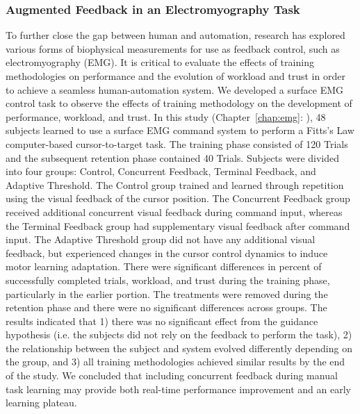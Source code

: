 \subsubsection{Augmented Feedback in an Electromyography Task}
To further close the gap between human and automation, research has explored various forms of biophysical measurements for use as feedback control, such as electromyography (EMG).
It is critical to evaluate the effects of training methodologies on performance and the evolution of workload and trust in order to achieve a seamless human-automation system.
We developed a surface EMG control task to observe the effects of training methodology on the development of performance, workload, and trust.
In this study (Chapter~\ref{chap:emg}: ), 48 subjects learned to use a surface EMG command system to perform a Fitts's Law computer-based cursor-to-target task.
The training phase consisted of 120 Trials and the subsequent retention phase contained 40 Trials.
Subjects were divided into four groups: Control, Concurrent Feedback, Terminal Feedback, and Adaptive Threshold.
The Control group trained and learned through repetition using the visual feedback of the cursor position.
The Concurrent Feedback group received additional concurrent visual feedback during command input, whereas the Terminal Feedback group had supplementary visual feedback after command input.
The Adaptive Threshold group did not have any additional visual feedback, but experienced changes in the cursor control dynamics to induce motor learning adaptation.
There were significant differences in percent of successfully completed trials, workload, and trust during the training phase, particularly in the earlier portion.
The treatments were removed during the retention phase and there were no significant differences across groups.
The results indicated that 1) there was no significant effect from the guidance hypothesis (i.e. the subjects did not rely on the feedback to perform the task), 2) the relationship between the subject and system evolved differently depending on the group, and 3) all training methodologies achieved similar results by the end of the study.
We concluded that including concurrent feedback during manual task learning may provide both real-time performance improvement and an early learning plateau.

